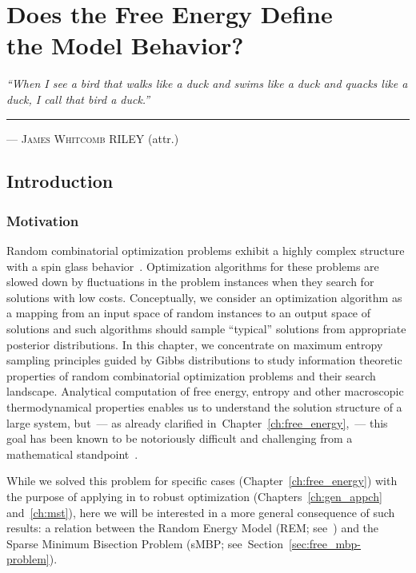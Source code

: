 \chapter[Does the Free Energy Define the Model Behavior?]{Does the Free Energy Define \\ the Model Behavior?}
\label{ch:smbp_and_rem}

\hfill
\begin{minipage}[t]{.75\textwidth}
\textit{``When I see a bird that walks like a duck and swims like a duck and
  quacks like a duck, I call that bird a duck.''} \\
  \hrule
  \vspace{.2cm}
  \hfill
  \textsc{---  James Whitcomb RILEY} (attr.)
\end{minipage}

\section{Introduction}

\subsection{Motivation}

Random combinatorial optimization problems exhibit a highly complex structure
with a spin glass behavior~\citep{Mezard87,SK:CG:MV:Science1983}. Optimization
algorithms for these problems are slowed down by fluctuations in the problem
instances when they search for solutions with low costs. Conceptually, we
consider an optimization algorithm as a mapping from an input space of random
instances to an output space of solutions and such algorithms should sample
``typical'' solutions from appropriate posterior distributions. In this chapter,
we concentrate on maximum entropy sampling principles guided by Gibbs
distributions to study information theoretic properties of random combinatorial
optimization problems and their search landscape.  Analytical computation of
free energy, entropy and other macroscopic thermodynamical properties enables us
to understand the solution structure of a large system, but~--- as already
clarified in~Chapter~\ref{ch:free_energy},~--- this goal has been
known to be notoriously difficult and challenging from a mathematical
standpoint~\citep{talagrand03}. 

While we solved this problem for specific cases (Chapter~\ref{ch:free_energy})
with the purpose of applying in to robust optimization (Chapters~\ref{ch:gen_appch}
and~\ref{ch:mst}), here we will be interested in a more general consequence of
such results: a relation between the Random Energy Model (REM;
see~\citealp{derrida81}) and the Sparse Minimum Bisection Problem (sMBP;
see~Section~\ref{sec:free_mbp-problem}).

